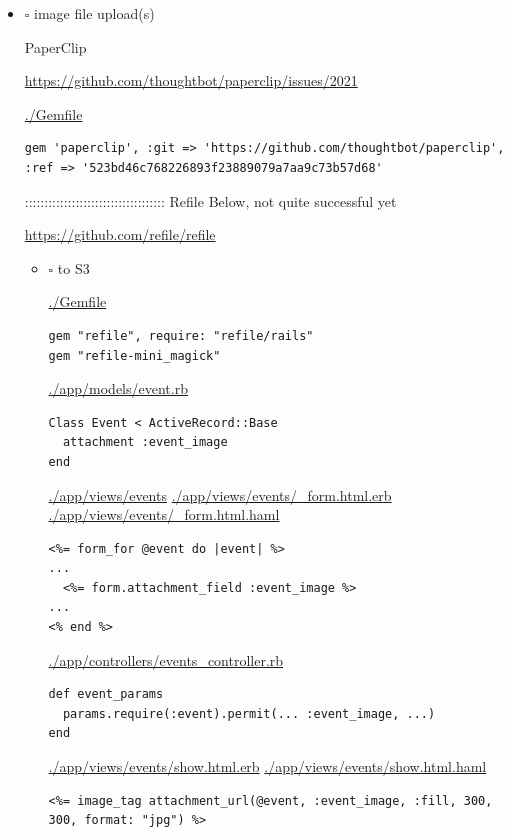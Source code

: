 \documentclass[11pt]{article}
\begin{document}
\begin{itemize}
\item $\square$ image file upload(s)

PaperClip

\url{https://github.com/thoughtbot/paperclip/issues/2021}

\url{./Gemfile}

\begin{verbatim}
gem 'paperclip', :git => 'https://github.com/thoughtbot/paperclip', :ref => '523bd46c768226893f23889079a7aa9c73b57d68'
\end{verbatim}

::::::::::::::::::::::::::::::::::::
Refile Below, not quite successful yet

\url{https://github.com/refile/refile}

\begin{itemize}
\item $\square$ to S3

\url{./Gemfile}

\begin{verbatim}
gem "refile", require: "refile/rails"
gem "refile-mini_magick"
\end{verbatim}

\url{./app/models/event.rb}

\begin{verbatim}
Class Event < ActiveRecord::Base
  attachment :event_image
end
\end{verbatim}

\url{./app/views/events}
\url{./app/views/events/_form.html.erb}
\url{./app/views/events/_form.html.haml}

\begin{verbatim}
<%= form_for @event do |event| %>
...
  <%= form.attachment_field :event_image %>
...
<% end %>
\end{verbatim}

\url{./app/controllers/events_controller.rb}

\begin{verbatim}
def event_params
  params.require(:event).permit(... :event_image, ...)
end
\end{verbatim}

\url{./app/views/events/show.html.erb}
\url{./app/views/events/show.html.haml}

\begin{verbatim}
<%= image_tag attachment_url(@event, :event_image, :fill, 300, 300, format: "jpg") %>
\end{verbatim}


\end{itemize}
\end{itemize}
\end{document}
